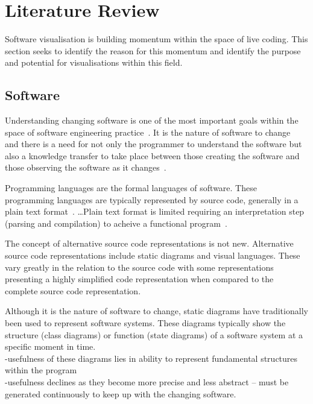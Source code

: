 
\chapter{Literature Review}

Software visualisation is building momentum within the space of live coding. This section seeks to identify the reason for this momentum and identify the purpose and potential for visualisations within this field.

\section{Software}

Understanding changing software is one of the most important goals within the space of software engineering practice~\cite{Tao2012}. It is the nature of software to change~\cite{Purushothaman2005} and there is a need for not only the programmer to understand the software but also a knowledge transfer to take place between those creating the software and those observing the software as it changes~.

Programming languages are the formal languages of software. These programming languages are typically represented by source code, generally in a plain text format~\cite{Badros2000}. \ldots Plain text format is limited requiring an interpretation step (parsing and compilation) to acheive a functional program~\cite{Badros2000}.

The concept of alternative source code representations is not new. Alternative source code representations include static diagrams and visual languages. These vary greatly in the relation to the source code with some representations presenting a highly simplified code representation when compared to the complete source code representation.

Although it is the nature of software to change, static diagrams have traditionally been used to represent software systems. These diagrams typically show the structure (class diagrams) or function (state diagrams) of a software system at a specific moment in time.\\
-usefulness of these diagrams lies in ability to represent fundamental structures within the program\\
-usefulness declines as they become more precise and less abstract -- must be generated continuously to keep up with the changing software.


